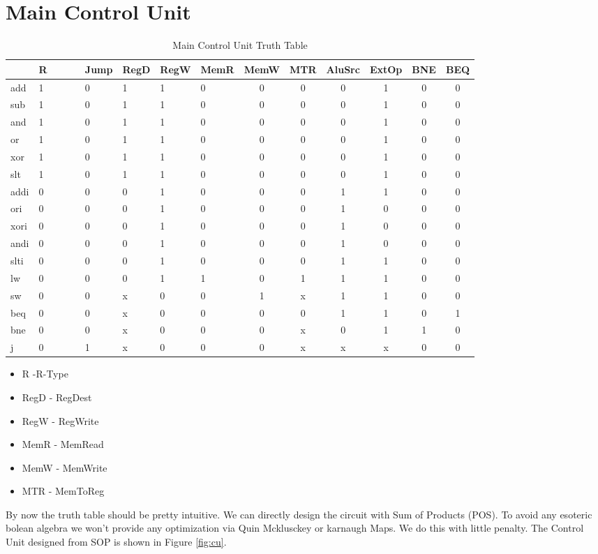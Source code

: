 \documentclass[12pt]{report}
\begin{document}
\section{Main Control Unit}
\begin{center}
\begin{longtable}{|l|l|l|l|l|l|c|c|c|c|c|c|}
\caption{Main Control Unit Truth Table} \label{tab:cu-table}\\
\hline
&R~~~~~&Jump&RegD&RegW&MemR&MemW&MTR&AluSrc&ExtOp&BNE&BEQ\\\hline
add&1&0&1&1&0&0&0&0&1&0&0\\\hline
sub&1&0&1&1&0&0&0&0&1&0&0\\\hline
and&1&0&1&1&0&0&0&0&1&0&0\\\hline
or&1&0&1&1&0&0&0&0&1&0&0\\\hline
xor&1&0&1&1&0&0&0&0&1&0&0\\\hline
slt&1&0&1&1&0&0&0&0&1&0&0\\\hline
addi&0&0&0&1&0&0&0&1&1&0&0\\\hline
ori&0&0&0&1&0&0&0&1&0&0&0\\\hline
xori&0&0&0&1&0&0&0&1&0&0&0\\\hline
andi&0&0&0&1&0&0&0&1&0&0&0\\\hline
slti&0&0&0&1&0&0&0&1&1&0&0\\\hline
lw&0&0&0&1&1&0&1&1&1&0&0\\\hline
sw&0&0&x&0&0&1&x&1&1&0&0\\\hline
beq&0&0&x&0&0&0&0&1&1&0&1\\\hline
bne&0&0&x&0&0&0&x&0&1&1&0\\\hline
j&0&1&x&0&0&0&x&x&x&0&0\\\hline
\end{longtable}
\end{center}
\begin{itemize}
\item R -R-Type
\item RegD - RegDest
\item RegW - RegWrite
\item MemR - MemRead
\item MemW - MemWrite
\item MTR - MemToReg
\end{itemize}
By now the truth table should be pretty intuitive. We can directly design the circuit with Sum of Products (POS). To avoid any esoteric bolean algebra we won't provide any optimization via Quin Mcklusckey or karnaugh Maps. We do this with little penalty. The Control Unit designed from SOP is shown in Figure \ref{fig:cu}.
\end{document}
